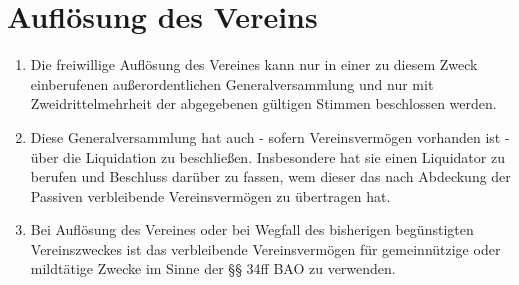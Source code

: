 \documentclass[a4paper,12pt]{article}
\begin{document}
\section{Auflösung des Vereins} %
\label{sec:Aufloesung}
\begin{enumerate}
\item Die freiwillige Auflösung des Vereines kann nur in einer zu diesem Zweck einberufenen außerordentlichen Generalversammlung und nur mit Zweidrittelmehrheit der abgegebenen gültigen Stimmen beschlossen werden.
\item Diese Generalversammlung hat auch - sofern Vereinsvermögen vorhanden ist - über die Liquidation zu beschließen. Insbesondere hat sie einen Liquidator zu berufen und Beschluss darüber zu fassen, wem dieser das nach Abdeckung der Passiven verbleibende Vereinsvermögen zu übertragen hat.
\item Bei Auflösung des Vereines oder bei Wegfall des bisherigen begünstigten Vereinszweckes ist das verbleibende Vereinsvermögen für gemeinnützige oder mildtätige Zwecke im Sinne der §§ 34ff BAO zu verwenden.
\end{enumerate}
\end{document}
